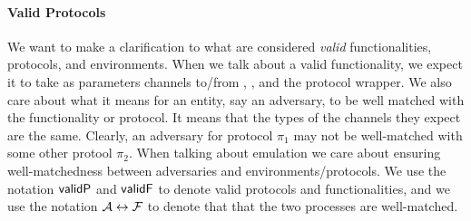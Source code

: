 \paragraph{Valid Protocols}
We want to make a clarification to what are considered \textit{valid} functionalities, protocols, and environments.
When we talk about a valid functionality, we expect it to take as parameters channels to/from \A, \Z, and the protocol wrapper.
We also care about what it means for an entity, say an adversary, to be well matched with the functionality or protocol.
It means that the types of the channels they expect are the same.
Clearly, an adversary for protocol $\pi_1$ may not be well-matched with some other protool $\pi_2$.
When talking about emulation we care about ensuring well-matchedness between adversaries and environments/protocols.
We use the notation ${\mathsf {validP}}$ and ${\mathsf {validF}}$ to denote valid protocols and functionalities, and we use the notation $\mathcal{A} \leftrightarrow \mathcal{F}$ to denote that that the two processes are well-matched.

